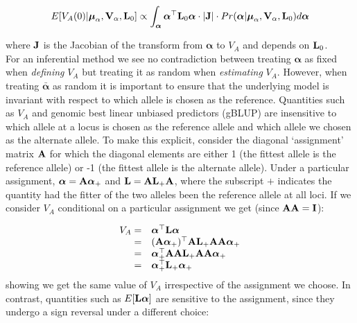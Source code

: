 \documentclass[12pt]{article}
\begin{document}
\begin{bibunit}
\begin{equation}
E[V_{A}(0) | \boldsymbol{\mu}_{{\alpha}}, \textbf{V}_{{\alpha}}, {\bf L}_0]\propto \int_{{\boldsymbol{\alpha}}} {\boldsymbol{\alpha}}^{\top}{\bf L}_0{\boldsymbol{\alpha}}\cdot|{\bf J}| \cdot Pr({\boldsymbol{\alpha}} |\boldsymbol{\mu}_{{\alpha}}, \textbf{V}_{{\alpha}}, {\bf L}_0)d{\boldsymbol{\alpha}}
\end{equation}

where ${\bf J}$ is the Jacobian of the transform from $\boldsymbol{\alpha}$ to $V_A$ and depends on ${\bf L}_0$.\\ 

For an inferential method we see no contradiction between treating $\boldsymbol{\alpha}$ as fixed when \emph{defining} $V_A$ but treating it as random when \emph{estimating} $V_A$. However, when treating $\bar{\boldsymbol{\alpha}}$ as random it is important to ensure that the underlying model is invariant with respect to which allele is chosen as the reference.  Quantities such as $V_A$ and genomic best linear unbiased predictors (gBLUP) are insensitive to which allele at a locus is chosen as the reference allele and which allele we chosen as the alternate allele. To make this explicit, consider the diagonal `assignment' matrix ${\bf A}$ for which the diagonal elements are either 1 (the fittest allele is the reference allele) or -1 (the fittest allele is the alternate allele). Under a particular assignment, $\boldsymbol{\alpha}={\bf A}\boldsymbol{\alpha}_{+}$ and ${\bf L}={\bf A}{\bf L}_{+}{\bf A}$, where the subscript $+$ indicates the quantity had the fitter of the two alleles been the reference allele at all loci. If we consider $V_A$ conditional on a particular assignment we get (since ${\bf A}{\bf A}={\bf I}$):


\begin{equation}
\begin{array}{rl}
V_A =& \boldsymbol{\alpha}^{\top}{\bf L}\boldsymbol{\alpha}\\
    =& ({\bf A}\boldsymbol{\alpha}_{+})^{\top}{\bf A}{\bf L}_{+}{\bf A}{\bf A}\boldsymbol{\alpha}_{+}\\
    =& \boldsymbol{\alpha}_{+}^{\top}{\bf A}{\bf A}{\bf L}_{+}{\bf A}{\bf A}\boldsymbol{\alpha}_{+}\\
    =& \boldsymbol{\alpha}_{+}^{\top}{\bf L}_{+}\boldsymbol{\alpha}_{+}\\
\end{array}
\end{equation}
showing we get the same value of $V_A$ irrespective of the assignment we choose.  In contrast, quantities such as $E[{\bf L}\boldsymbol{\alpha}]$ are sensitive to the assignment, since they undergo a sign reversal under a different choice: 


\end{bibunit}
\end{document}
